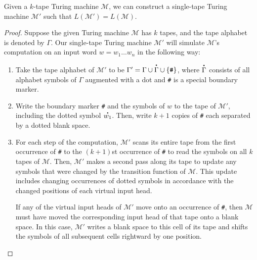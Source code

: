 \begin{theorem}\label{thm:ktapeequivalent}
Given a $k$-tape Turing machine $\mathcal{M}$, we can construct a single-tape Turing machine $\mathcal{M}'$ such that $L(\mathcal{M}') = L(\mathcal{M})$.

\begin{proof}
Suppose the given Turing machine $\mathcal{M}$ has $k$ tapes, and the tape alphabet is denoted by $\Gamma$. Our single-tape Turing machine $\mathcal{M}'$ will simulate $\mathcal{M}$'s computation on an input word $w = w_{1} \dots w_{n}$ in the following way: 
\begin{enumerate}
\item Take the tape alphabet of $\mathcal{M}'$ to be $\Gamma' = \Gamma \cup \overset{\mbox{\large\bfseries .}}{\Gamma} \cup \{\texttt{\#}\}$, where $\overset{\mbox{\large\bfseries .}}{\Gamma}$ consists of all alphabet symbols of $\Gamma$ augmented with a dot and \texttt{\#} is a special boundary marker.
\item Write the boundary marker \texttt{\#} and the symbols of $w$ to the tape of $\mathcal{M}'$, including the dotted symbol $\overset{\mbox{\large\bfseries .}}{w_{1}}$. Then, write $k+1$ copies of \texttt{\#} each separated by a dotted blank space.
\begin{center}
\end{center}
\item For each step of the computation, $\mathcal{M}'$ scans its entire tape from the first occurrence of \texttt{\#} to the $(k+1)$st occurrence of \texttt{\#} to read the symbols on all $k$ tapes of $\mathcal{M}$. Then, $\mathcal{M}'$ makes a second pass along its tape to update any symbols that were changed by the transition function of $\mathcal{M}$. This update includes changing occurrences of dotted symbols in accordance with the changed positions of each virtual input head.

If any of the virtual input heads of $\mathcal{M}'$ move onto an occurrence of \texttt{\#}, then $\mathcal{M}$ must have moved the corresponding input head of that tape onto a blank space. In this case, $\mathcal{M}'$ writes a blank space to this cell of its tape and shifts the symbols of all subsequent cells rightward by one position. \qedhere
\end{enumerate}
\end{proof}
\end{theorem}

